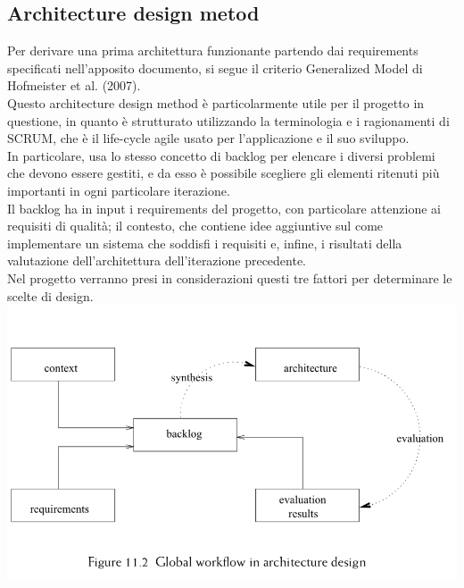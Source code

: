\documentclass{article}
\begin{document}
\subsection{Architecture design metod }
Per derivare una prima architettura funzionante partendo dai requirements specificati nell’apposito documento, si segue il criterio Generalized Model di Hofmeister et al. (2007).
\\Questo architecture design method è particolarmente utile per il progetto in questione, in quanto è strutturato utilizzando la terminologia e i ragionamenti di SCRUM, che è il life-cycle agile usato per l’applicazione e il suo sviluppo. 
\\In particolare, usa lo stesso concetto di backlog per elencare i diversi problemi che devono essere gestiti, e da esso è possibile scegliere gli elementi ritenuti più importanti in ogni particolare iterazione. 
\\Il backlog ha in input i requirements del progetto, con particolare attenzione ai requisiti di qualità; il contesto, che contiene idee aggiuntive sul come implementare un sistema che soddisfi i requisiti e, infine, i risultati della valutazione dell’architettura dell’iterazione precedente. 
\\Nel progetto verranno presi in considerazioni questi tre fattori per determinare le scelte di design. 
\\\includegraphics[scale = 0.75]{"Immagini/GeneralizedModel.png"}
\end{document}

